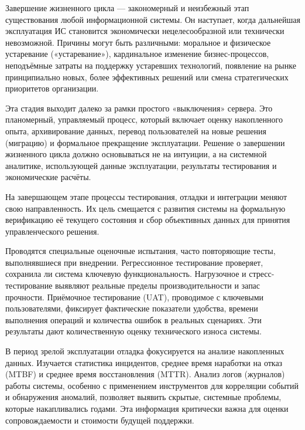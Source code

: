 \documentclass{SibFU-docs}
\begin{document}

Завершение жизненного цикла — закономерный и неизбежный этап существования любой информационной системы. Он наступает, когда дальнейшая эксплуатация ИС становится экономически нецелесообразной или технически невозможной. Причины могут быть различными: моральное и физическое устаревание («устаревание»), кардинальное изменение бизнес-процессов, неподъёмные затраты на поддержку устаревших технологий, появление на рынке принципиально новых, более эффективных решений или смена стратегических приоритетов организации.

Эта стадия выходит далеко за рамки простого «выключения» сервера. Это планомерный, управляемый процесс, который включает оценку накопленного опыта, архивирование данных, перевод пользователей на новые решения (миграцию) и формальное прекращение эксплуатации. Решение о завершении жизненного цикла должно основываться не на интуиции, а на системной аналитике, использующей данные эксплуатации, результаты тестирования и экономические расчёты. \cite{OGC_ITIL_2007, gost3460190}


На завершающем этапе процессы тестирования, отладки и интеграции меняют свою направленность. Их цель смещается с развития системы на формальную верификацию её текущего состояния и сбор объективных данных для принятия управленческого решения.


Проводятся специальные оценочные испытания, часто повторяющие тесты, выполнявшиеся при внедрении. Регрессионное тестирование проверяет, сохранила ли система ключевую функциональность. Нагрузочное и стресс-тестирование выявляют реальные пределы производительности и запас прочности. Приёмочное тестирование (UAT), проводимое с ключевыми пользователями, фиксирует фактические показатели удобства, времени выполнения операций и количества ошибок в реальных сценариях. Эти результаты дают количественную оценку технического износа системы. \cite{ISO29119-1-2022, Kulikov2017Testing}


В период зрелой эксплуатации отладка фокусируется на анализе накопленных данных. Изучается статистика инцидентов, среднее время наработки на отказ (MTBF) и среднее время восстановления (MTTR). Анализ логов (журналов) работы системы, особенно с применением инструментов для корреляции событий и обнаружения аномалий, позволяет выявить скрытые, системные проблемы, которые накапливались годами. Эта информация критически важна для оценки сопровождаемости и стоимости будущей поддержки. \cite{Murphy2016SRE}
\end{document}
